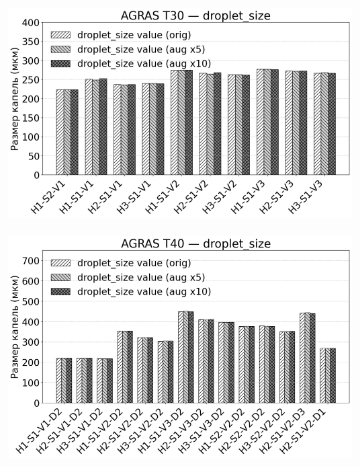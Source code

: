 \begin{figure}[htbp]
	\begin{minipage}{0.95\linewidth}
	\begin{subfigure}[t]{\dimexpr.5\linewidth-1.3em\relax}
		\centering
		\includegraphics[width=.95\linewidth,valign=t]{my_folder/images/augment/spraying_performance/T30-droplet-size.png}
	\end{subfigure}
	\hfill %
	\begin{subfigure}[t]{\dimexpr.5\linewidth-1.3em\relax}
		\centering
		\includegraphics[width=.95\linewidth,valign=t]{my_folder/images/augment/spraying_performance/T40-droplet-size.png}
	\end{subfigure}
	\\[20pt]
	\begin{subfigure}[t]{\dimexpr.5\linewidth-1.3em\relax}

\end{subfigure}
\end{minipage}
\end{figure}
